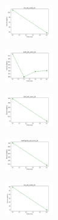 \vspace*{\fill}

\newpage

\vspace*{\fill}

\begin{figure}[H]
    \centering
    \begin{subfigure}
        \centering
        \includegraphics[width=0.234\textwidth]{img/copkm/iris_set_const_20_949004259_cost.png}
    \end{subfigure}
    \hfill
    \begin{subfigure}
        \centering
        \includegraphics[width=0.234\textwidth]{img/copkm/ecoli_set_const_20_949004259_cost.png}
    \end{subfigure}
    \hfill
    \begin{subfigure}
        \centering
        \includegraphics[width=0.234\textwidth]{img/copkm/rand_set_const_20_949004259_cost.png}
    \end{subfigure}
    \hfill
    \begin{subfigure}
        \centering
        \includegraphics[width=0.234\textwidth]{img/copkm/newthyroid_set_const_20_949004259_cost.png}
    \end{subfigure}
    \hfill
    \begin{subfigure}
        \centering
        \includegraphics[width=0.234\textwidth]{img/copkm/iris_set_const_20_589741062_cost.png}

\end{subfigure}
\end{figure}
